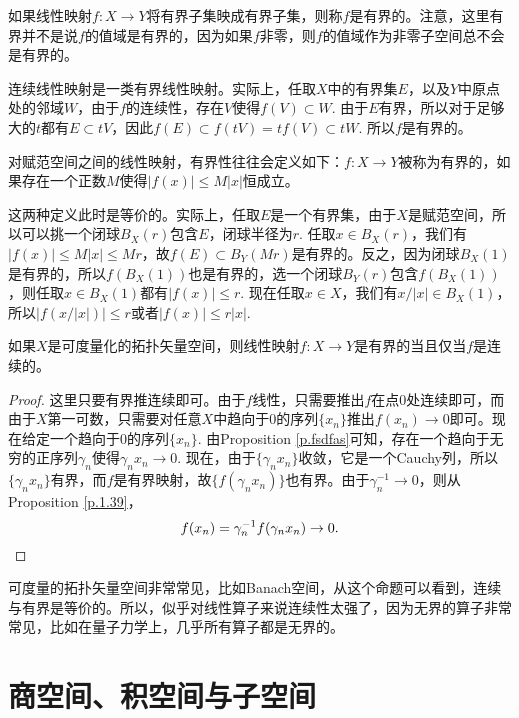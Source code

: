 \begin{para}[有界线性映射]
	如果线性映射$f:X\to Y$将有界子集映成有界子集，则称$f$是有界的。注意，这里有界并不是说$f$的值域是有界的，因为如果$f$非零，则$f$的值域作为非零子空间总不会是有界的。

	连续线性映射是一类有界线性映射。实际上，任取$X$中的有界集$E$，以及$Y$中原点处的邻域$W$，由于$f$的连续性，存在$V$使得$f(V)\subset W$. 由于$E$有界，所以对于足够大的$t$都有$E\subset tV$，因此$f(E)\subset f(tV)=tf(V)\subset tW$. 所以$f$是有界的。

	对赋范空间之间的线性映射，有界性往往会定义如下：$f:X\to Y$被称为有界的，如果存在一个正数$M$使得$|f(x)|\leq M|x|$恒成立。

	这两种定义此时是等价的。实际上，任取$E$是一个有界集，由于$X$是赋范空间，所以可以挑一个闭球$B_X(r)$包含$E$，闭球半径为$r$.  
	任取$x\in B_X(r)$，我们有$|f(x)|\leq M|x|\leq Mr$，故$f(E)\subset B_Y(Mr)$是有界的。反之，因为闭球$B_X(1)$是有界的，所以$f(B_X(1))$也是有界的，选一个闭球$B_Y(r)$包含$f(B_X(1))$，则任取$x\in B_X(1)$都有$|f(x)|\leq r$. 现在任取$x\in X$，我们有$x/|x|\in B_X(1)$，所以$|f(x/|x|)| \leq r$或者$|f(x)|\leq r|x|$.
\end{para}

\begin{pro}\label{1.42}
	如果$X$是可度量化的拓扑矢量空间，则线性映射$f:X\to Y$是有界的当且仅当$f$是连续的。
\end{pro}

\begin{proof}
	这里只要有界推连续即可。由于$f$线性，只需要推出$f$在点$0$处连续即可，而由于$X$第一可数，只需要对任意$X$中趋向于$0$的序列$\{x_n\}$推出$f(x_n)\to 0$即可。现在给定一个趋向于$0$的序列$\{x_n\}$. 由Proposition \ref{p.fsdfas}可知，存在一个趋向于无穷的正序列$\gamma_n$使得$\gamma_nx_n\to 0$. 现在，由于$\{\gamma_nx_n\}$收敛，它是一个Cauchy列，所以$\{\gamma_nx_n\}$有界，而$f$是有界映射，故$\{f(\gamma_nx_n)\}$也有界。由于$\gamma^{-1}_n\to 0$，则从Proposition \ref{p.1.39}，
	\[
	f(x_n)=\gamma_n^{-1}f(\gamma_n x_n)\to 0.\qedhere
	\]
\end{proof}

可度量的拓扑矢量空间非常常见，比如Banach空间，从这个命题可以看到，连续与有界是等价的。所以，似乎对线性算子来说连续性太强了，因为无界的算子非常常见，比如在量子力学上，几乎所有算子都是无界的。

\section{商空间、积空间与子空间}

